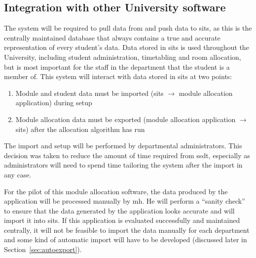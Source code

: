 
\subsection{Integration with other University software}

The system will be required to pull data from and push data to \gls{sits}, as
this is the centrally maintained database that always contains a true and
accurate representation of every student's data. Data stored in \gls{sits} is
used throughout the University, including student administration, timetabling
and room allocation, but is most important for the staff in the department
that the student is a member of. This system will interact with data stored in
\gls{sits} at two points:

\begin{enumerate}
  \item Module and student data must be imported (\gls{sits} $\rightarrow$
        module allocation application) during setup
  \item Module allocation data must be exported (module allocation application
        $\rightarrow$ \gls{sits}) after the allocation algorithm has run
\end{enumerate}

The import and setup will be performed by departmental administrators. This
decision was taken to reduce the amount of time required from \gls{ssdt},
especially as administrators will need to spend time tailoring the system
after the import in any case.

For the pilot of this module allocation software, the data produced by the
application will be processed manually by \gls{mh}. He will perform a ``sanity
check'' to ensure that the data generated by the application looks accurate
and will import it into \gls{sits}. If this application is evaluated
successfully and maintained centrally, it will not be feasible to import the
data manually for each department and some kind of automatic import will have
to be developed (discussed later in Section~\ref{sec:autoexport}).
